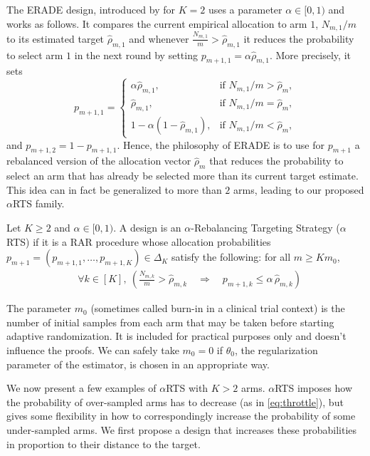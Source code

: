 The ERADE design, introduced by \cite{hu2009efficient} for $K=2$ uses a parameter $\alpha \in [0,1)$ and works as follows. It compares the current empirical allocation to arm $1$, $N_{m,1}/m$ to its estimated target $\hat{\rho}_{m,1}$ and whenever $\frac{N_{m,1}}{m}>\hat\rho_{m,1}$ it reduces the probability to select arm $1$ in the next round by setting $p_{m+1,1}=\alpha \hat\rho_{m,1}$.
More precisely, it sets
	\begin{equation*} \label{eq:erade}
		p_{m+1,1} =
		\begin{cases}
			\alpha \hat{\rho}_{m,1}, & \text{if } N_{m,1}/m > \hat{\rho}_m, \\[6pt]
			\hat{\rho}_{m,1}, & \text{if } N_{m,1}/m = \hat{\rho}_m, \\[6pt]
			1 - \alpha(1 - \hat{\rho}_{m,1}), & \text{if } N_{m,1}/m < \hat{\rho}_m,
		\end{cases}
	\end{equation*}
and $p_{m+1,2}=1-p_{m+1,1}$. Hence, the philosophy of ERADE is to use for $p_{m+1}$ a rebalanced version of the allocation vector $\hat{\rho}_m$ that reduces the probability to select an arm that has already be selected more than its current target estimate. This idea can in fact be generalized to more than $2$ arms, leading to our proposed $\alpha$RTS family.



\begin{definition} Let $K\geq 2$ and $\alpha\in[0,1)$. A design is an $\alpha$-Rebalancing Targeting Strategy ($\alpha$RTS) if it is a RAR procedure whose allocation probabilities $p_{m+1}=(p_{m+1,1},\dots,p_{m+1,K}) \in \Delta_K$ satisfy the following: for all $m \geq Km_0$,
	\begin{align}
		&\forall k \in [K], \  \left(\frac{N_{m,k}}{m}>\hat\rho_{m,k}\quad \Longrightarrow\quad p_{m+1,k}\le \alpha\,\hat\rho_{m,k}\right) \label{eq:throttle}
	\end{align}
\end{definition}
\begin{remark}
	The parameter $m_0$ (sometimes called burn-in in a clinical trial context) is the number of initial samples from each arm that may be taken before starting adaptive randomization. It is included for practical purposes only and doesn't influence the proofs. We can safely take $m_0 = 0$ if $\theta_0$, the regularization parameter of the estimator, is chosen in an appropriate way.
\end{remark}
We now present a few examples of $\alpha$RTS with $K > 2$ arms. $\alpha$RTS imposes how the probability of over-sampled arms has to decrease (as in \eqref{eq:throttle}), but gives some flexibility in how to correspondingly increase the probability of some under-sampled arms. We first propose a design that increases these probabilities in proportion to their distance to the target.

